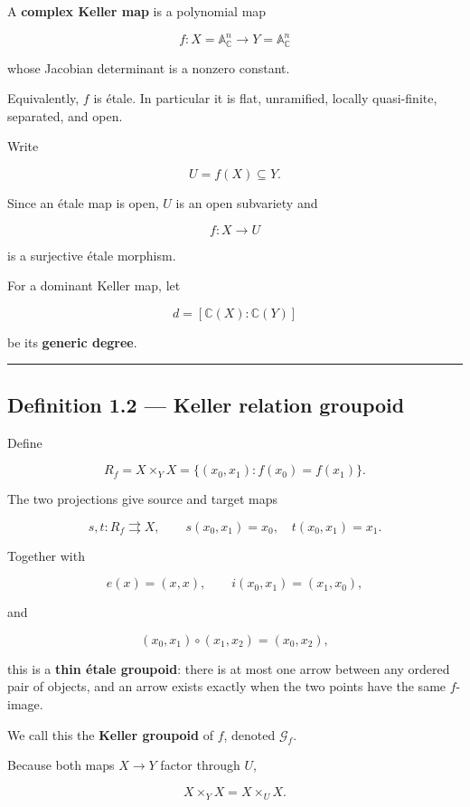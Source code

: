 A \textbf{complex Keller map} is a polynomial map

\[
f\colon X=\mathbb A^n_{\mathbb C}\longrightarrow
Y=\mathbb A^n_{\mathbb C}
\]

whose Jacobian determinant is a nonzero constant.

Equivalently, \(f\) is étale. In particular it is flat, unramified,
locally quasi-finite, separated, and open.

Write

\[
U=f(X)\subseteq Y.
\]

Since an étale map is open, \(U\) is an open subvariety and

\[
f\colon X\longrightarrow U
\]

is a surjective étale morphism.

For a dominant Keller map, let

\[
d=[\mathbb C(X):\mathbb C(Y)]
\]

be its \textbf{generic degree}.

\begin{center}\rule{0.5\linewidth}{0.5pt}\end{center}

\subsection{Definition 1.2 --- Keller relation
groupoid}\label{definition-1.2-keller-relation-groupoid}

Define

\[
R_f=X\times_Y X
=\{(x_0,x_1):f(x_0)=f(x_1)\}.
\]

The two projections give source and target maps

\[
s,t\colon R_f\rightrightarrows X,
\qquad
s(x_0,x_1)=x_0,\quad t(x_0,x_1)=x_1.
\]

Together with

\[
e(x)=(x,x),\qquad
i(x_0,x_1)=(x_1,x_0),
\]

and

\[
(x_0,x_1)\circ(x_1,x_2)=(x_0,x_2),
\]

this is a \textbf{thin étale groupoid}: there is at most one arrow
between any ordered pair of objects, and an arrow exists exactly when
the two points have the same \(f\)-image.

We call this the \textbf{Keller groupoid} of \(f\), denoted
\(\mathcal G_f\).

Because both maps \(X\to Y\) factor through \(U\),

\[
X\times_Y X=X\times_U X.
\]

